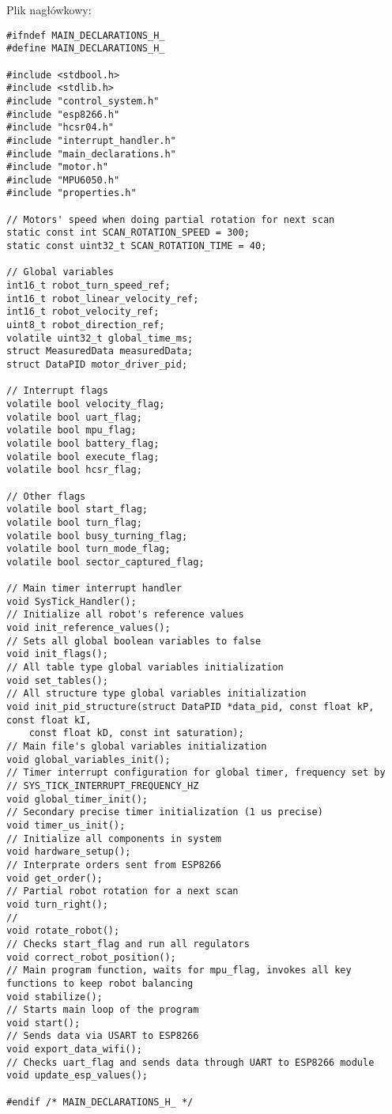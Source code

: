 \documentclass[a4paper,12pt,twoside,openany]{report}
\begin{document}
\noindent Plik nagłówkowy:\\
\begin{lstlisting}[style=customc]
#ifndef MAIN_DECLARATIONS_H_
#define MAIN_DECLARATIONS_H_

#include <stdbool.h>
#include <stdlib.h>
#include "control_system.h"
#include "esp8266.h"
#include "hcsr04.h"
#include "interrupt_handler.h"
#include "main_declarations.h"
#include "motor.h"
#include "MPU6050.h"
#include "properties.h"

// Motors' speed when doing partial rotation for next scan
static const int SCAN_ROTATION_SPEED = 300;
static const uint32_t SCAN_ROTATION_TIME = 40;

// Global variables
int16_t robot_turn_speed_ref;
int16_t robot_linear_velocity_ref;
int16_t robot_velocity_ref;
uint8_t robot_direction_ref;
volatile uint32_t global_time_ms;
struct MeasuredData measuredData;
struct DataPID motor_driver_pid;

// Interrupt flags
volatile bool velocity_flag;
volatile bool uart_flag;
volatile bool mpu_flag;
volatile bool battery_flag;
volatile bool execute_flag;
volatile bool hcsr_flag;

// Other flags
volatile bool start_flag;
volatile bool turn_flag;
volatile bool busy_turning_flag;
volatile bool turn_mode_flag;
volatile bool sector_captured_flag;

// Main timer interrupt handler
void SysTick_Handler();
// Initialize all robot's reference values
void init_reference_values();
// Sets all global boolean variables to false
void init_flags();
// All table type global variables initialization
void set_tables();
// All structure type global variables initialization
void init_pid_structure(struct DataPID *data_pid, const float kP, const float kI, 
	const float kD, const int saturation);
// Main file's global variables initialization
void global_variables_init();
// Timer interrupt configuration for global timer, frequency set by 
// SYS_TICK_INTERRUPT_FREQUENCY_HZ
void global_timer_init();
// Secondary precise timer initialization (1 us precise)
void timer_us_init();
// Initialize all components in system
void hardware_setup();
// Interprate orders sent from ESP8266
void get_order();
// Partial robot rotation for a next scan
void turn_right();
//
void rotate_robot();
// Checks start_flag and run all regulators
void correct_robot_position();
// Main program function, waits for mpu_flag, invokes all key functions to keep robot balancing
void stabilize();
// Starts main loop of the program
void start();
// Sends data via USART to ESP8266
void export_data_wifi();
// Checks uart_flag and sends data through UART to ESP8266 module
void update_esp_values();

#endif /* MAIN_DECLARATIONS_H_ */

\end{lstlisting}
\end{document}
